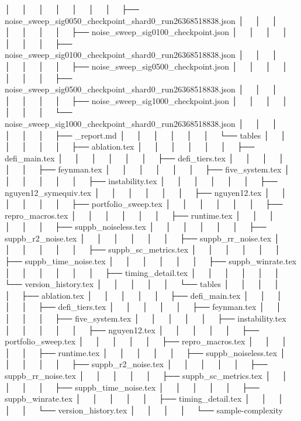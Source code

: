 │   │       │   │   │   │   │   ├── noise_sweep_sig0050_checkpoint_shard0_run26368518838.json
│   │       │   │   │   │   │   ├── noise_sweep_sig0100_checkpoint.json
│   │       │   │   │   │   │   ├── noise_sweep_sig0100_checkpoint_shard0_run26368518838.json
│   │       │   │   │   │   │   ├── noise_sweep_sig0500_checkpoint.json
│   │       │   │   │   │   │   ├── noise_sweep_sig0500_checkpoint_shard0_run26368518838.json
│   │       │   │   │   │   │   ├── noise_sweep_sig1000_checkpoint.json
│   │       │   │   │   │   │   └── noise_sweep_sig1000_checkpoint_shard0_run26368518838.json
│   │       │   │   │   │   ├── _report.md
│   │       │   │   │   │   └── tables
│   │       │   │   │   │       ├── ablation.tex
│   │       │   │   │   │       ├── defi_main.tex
│   │       │   │   │   │       ├── defi_tiers.tex
│   │       │   │   │   │       ├── feynman.tex
│   │       │   │   │   │       ├── five_system.tex
│   │       │   │   │   │       ├── instability.tex
│   │       │   │   │   │       ├── nguyen12_symequiv.tex
│   │       │   │   │   │       ├── nguyen12.tex
│   │       │   │   │   │       ├── portfolio_sweep.tex
│   │       │   │   │   │       ├── repro_macros.tex
│   │       │   │   │   │       ├── runtime.tex
│   │       │   │   │   │       ├── suppb_noiseless.tex
│   │       │   │   │   │       ├── suppb_r2_noise.tex
│   │       │   │   │   │       ├── suppb_rr_noise.tex
│   │       │   │   │   │       ├── suppb_sc_metrics.tex
│   │       │   │   │   │       ├── suppb_time_noise.tex
│   │       │   │   │   │       ├── suppb_winrate.tex
│   │       │   │   │   │       ├── timing_detail.tex
│   │       │   │   │   │       └── version_history.tex
│   │       │   │   │   └── tables
│   │       │   │   │       ├── ablation.tex
│   │       │   │   │       ├── defi_main.tex
│   │       │   │   │       ├── defi_tiers.tex
│   │       │   │   │       ├── feynman.tex
│   │       │   │   │       ├── five_system.tex
│   │       │   │   │       ├── instability.tex
│   │       │   │   │       ├── nguyen12.tex
│   │       │   │   │       ├── portfolio_sweep.tex
│   │       │   │   │       ├── repro_macros.tex
│   │       │   │   │       ├── runtime.tex
│   │       │   │   │       ├── suppb_noiseless.tex
│   │       │   │   │       ├── suppb_r2_noise.tex
│   │       │   │   │       ├── suppb_rr_noise.tex
│   │       │   │   │       ├── suppb_sc_metrics.tex
│   │       │   │   │       ├── suppb_time_noise.tex
│   │       │   │   │       ├── suppb_winrate.tex
│   │       │   │   │       ├── timing_detail.tex
│   │       │   │   │       └── version_history.tex
│   │       │   │   └── sample-complexity
